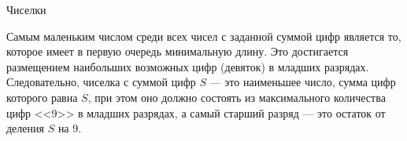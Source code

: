 \begin{tutorial}{Чиселки}

Самым маленьким числом среди всех чисел с заданной суммой цифр является то, которое имеет в первую очередь минимальную длину. Это достигается размещением наибольших возможных цифр (девяток) в младших разрядах. Следовательно, чиселка с суммой цифр $S$ --- это наименьшее число, сумма цифр которого равна $S$, при этом оно должно состоять из максимального количества цифр <<9>> в младших разрядах, а самый старший разряд --- это остаток от деления $S$ на 9.

\end{tutorial}
